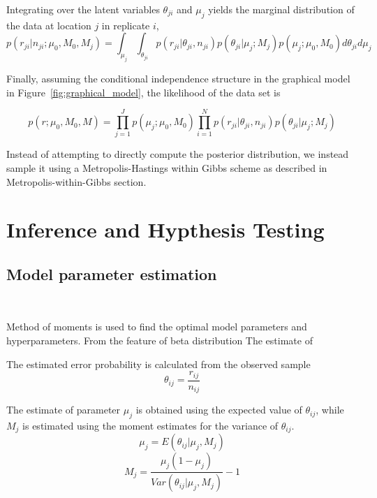 \documentclass[11pt,reqno]{amsart}
\begin{document}
Integrating over the latent variables $\theta_{ji}$ and $\mu_j$ yields the marginal distribution of the data at location $j$ in replicate $i$, 
\begin{equation}
p \left( r_{ji} | n_{ji} ; \mu_0, M_0, M_j \right) = \int_{\mu_j} \int_{\theta_{ji}}  p \left( r_{ji} | \theta_{ji}, n_{ji} \right) p\left( \theta_{ji} | \mu_j; M_j \right) p\left( \mu_j; \mu_0, M_0 \right) d\theta_{ji} d\mu_j
\end{equation}

Finally, assuming the conditional independence structure in the graphical model in Figure~\ref{fig:graphical_model}, the likelihood of the data set is

\begin{equation}
p \left( r ; \mu_0, M_0, M \right) = \prod_{j=1}^J p\left( \mu_j; \mu_0, M_0 \right) \prod_{i=1}^N p \left( r_{ji} | \theta_{ji}, n_{ji} \right) p\left( \theta_{ji} | \mu_j; M_j \right) 
\end{equation}

Instead of attempting to directly compute the posterior distribution, we instead sample it using a Metropolis-Hastings within Gibbs scheme as described in Metropolis-within-Gibbs section.

\section{Inference and Hypthesis Testing}
\subsection{Model parameter estimation}\

Method of moments is used to find the optimal model parameters and hyperparameters. From the feature of beta distribution
The estimate of 

The estimated error probability is calculated from the observed sample
\begin{equation}
 \theta_{ij}=\frac{r_{ij}}{n_{ij}}
\end{equation}

The estimate of parameter $\mu_j$ is obtained using the expected value of $\theta_{ij}$, while $M_j$ is estimated using the moment estimates for the variance of $\theta_{ij}$.
\begin{equation}
 \mu_j=E(\theta_{ij}|\mu_j,M_j)
\end{equation}
\begin{equation}
 M_j=\frac{\mu_j(1-\mu_j)}{Var(\theta_{ij}|\mu_j,M_j)}-1
\end{equation}
\end{document}
